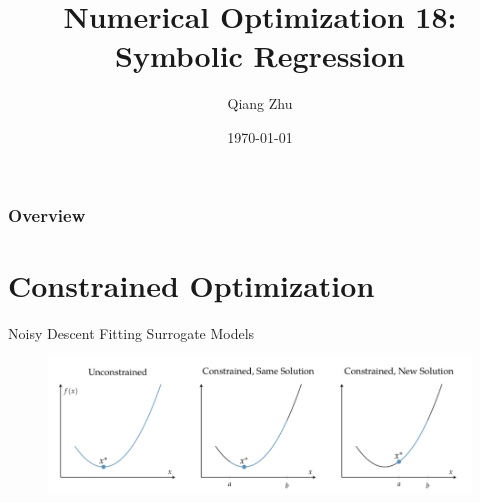 \documentclass{beamer}
\title[Symbolic Regression]{Numerical Optimization 18: Symbolic Regression} %
\author{Qiang Zhu} %
\institute[University of Nevada Las Vegas] %
{
University of Nevada Las Vegas\\ %
\medskip
}
\date{\today} %
\begin{document}
\begin{frame}
\titlepage %
\end{frame}

\begin{frame}
\frametitle{Overview} %
\tableofcontents %
\end{frame}



\section{Constrained Optimization}
\begin{frame}{Noisy Descent}
Fitting Surrogate Models
\begin{figure}
\centering
\includegraphics[width=120mm]{Figs/constraint-ab.jpeg}
\end{figure}   

\end{frame}
\end{document}
